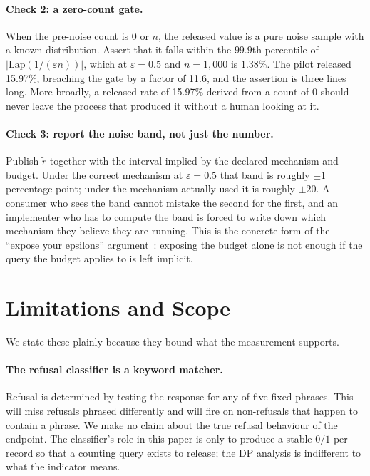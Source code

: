 \documentclass[journal]{IEEEtran}
\theoremstyle{definition}
\newcommand{\Nrec}{1{,}000}
\newcommand{\Nrefused}{0}
\newcommand{\WorstEps}{0.5}
\newcommand{\WorstRelease}{15.97}
\newcommand{\GateFactor}{11.6}
\newcommand{\GatePc}{1.38}
\begin{document}
\paragraph{Check 2: a zero-count gate.}
When the pre-noise count is $0$ or $n$, the released value is a pure noise sample
with a known distribution. Assert that it falls within the $99.9$th percentile of
$|\mathrm{Lap}(1/(\varepsilon n))|$, which at $\varepsilon=\WorstEps$ and
$n=\Nrec$ is $\GatePc\%$. The pilot released \WorstRelease\%, breaching the gate
by a factor of \GateFactor, and the assertion is three lines long. More broadly, a released
rate of \WorstRelease\% derived from a count of \Nrefused{} should never leave the
process that produced it without a human looking at it.

\paragraph{Check 3: report the noise band, not just the number.}
Publish $\tilde{r}$ together with the interval implied by the declared mechanism
and budget. Under the correct mechanism at $\varepsilon=0.5$ that band is roughly
$\pm 1$ percentage point; under the mechanism actually used it is roughly $\pm 20$.
A consumer who sees the band cannot mistake the second for the first, and an
implementer who has to compute the band is forced to write down which mechanism
they believe they are running. This is the concrete form of the ``expose your
epsilons'' argument~\cite{dwork2019epsilons}: exposing the budget alone is not
enough if the query the budget applies to is left implicit.

\section{Limitations and Scope}
\label{sec:limits}

We state these plainly because they bound what the measurement supports.

\paragraph{The refusal classifier is a keyword matcher.}
Refusal is determined by testing the response for any of five fixed phrases. This
will miss refusals phrased differently and will fire on non-refusals that happen
to contain a phrase. We make no claim about the true refusal behaviour of the
endpoint. The classifier's role in this paper is only to produce a stable
$0/1$ per record so that a counting query exists to release; the DP analysis is
indifferent to what the indicator means.
\end{document}
